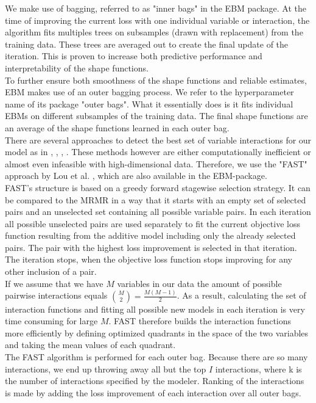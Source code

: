 \documentclass[12pt,titlepage]{article}
\begin{document}
\noindent
We make use of bagging, referred to as "inner bags" in the EBM package. At the time of improving the current loss with one individual variable or interaction, the algorithm fits multiples trees on subsamples (drawn with replacement) from the training data. These trees are averaged out to create the final update of the iteration. This is proven to increase both predictive performance and interpretability of the shape functions.\\
To further ensure both smoothness of the shape functions and reliable estimates, EBM makes use of an outer bagging process. We refer to the hyperparameter name of its package "outer bags". What it essentially does is it fits individual EBMs on different subsamples of the training data. The final shape functions are an average of the shape functions learned in each outer bag. \\

There are several approaches to detect the best set of variable interactions for our model as in \cite{anova_interaction}, \cite{pdf_interaction}, \cite{guide}, \cite{grove}. These methods however are either computationally inefficient or almost even infeasible with high-dimensional data. Therefore, we use the "FAST" approach by Lou et al. \cite{ga2m}, which are also available in the EBM-package. \\
FAST's structure is based on a greedy forward stagewise selection strategy. It can be compared to the MRMR in a way that it starts with an empty set of selected pairs and an unselected set containing all possible variable pairs. In each iteration all possible unselected pairs are used separately to fit the current objective loss function resulting from the additive model including only the already selected pairs. The pair with the highest loss improvement is selected in that iteration. The iteration stops, when the objective loss function stops improving for any other inclusion of a pair. \\
If we assume that we have $M$ variables in our data the amount of possible pairwise interactions equals $\binom{M}{2} = \frac{M(M-1)}{2}$. As a result, calculating the set of interaction functions and fitting all possible new models in each iteration is very time consuming for large $M$. FAST therefore builds the interaction functions more efficiently by defining optimized quadrants in the space of the two variables and taking the mean values of each quadrant. \\
The FAST algorithm is performed for each outer bag. Because there are so many interactions, we end up throwing away all but the top $I$ interactions, where k is the number of interactions specified by the modeler. Ranking of the interactions is made by adding the loss improvement of each interaction over all outer bags. \\
\end{document}
